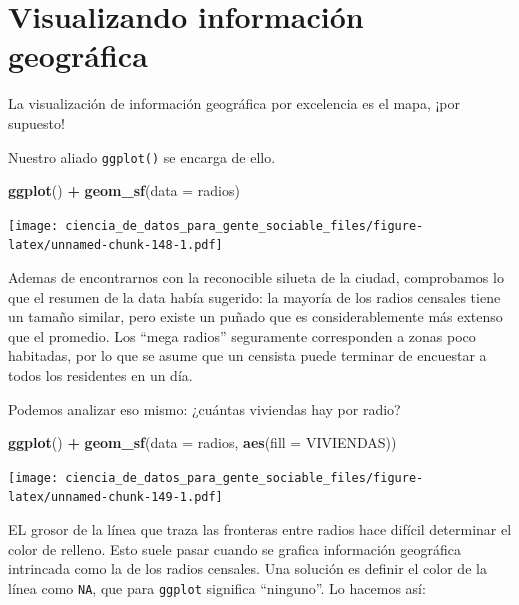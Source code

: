 \documentclass[spanish,]{book}
\newenvironment{Shaded}{\begin{snugshade}}{\end{snugshade}}
\newcommand{\DataTypeTok}[1]{\textcolor[rgb]{0.13,0.29,0.53}{#1}}
\newcommand{\KeywordTok}[1]{\textcolor[rgb]{0.13,0.29,0.53}{\textbf{#1}}}
\newcommand{\NormalTok}[1]{#1}
\newcommand{\OperatorTok}[1]{\textcolor[rgb]{0.81,0.36,0.00}{\textbf{#1}}}
\newcommand{\StringTok}[1]{\textcolor[rgb]{0.31,0.60,0.02}{#1}}
\begin{document}
\hypertarget{visualizando-informacion-geografica}{%
\section{Visualizando información geográfica}\label{visualizando-informacion-geografica}}

La visualización de información geográfica por excelencia es el mapa, ¡por supuesto!

Nuestro aliado \texttt{ggplot()} se encarga de ello.

\begin{Shaded}
\begin{Highlighting}[]
\KeywordTok{ggplot}\NormalTok{() }\OperatorTok{+}\StringTok{ }\KeywordTok{geom_sf}\NormalTok{(}\DataTypeTok{data =}\NormalTok{ radios)}
\end{Highlighting}
\end{Shaded}

\texttt{[image: ciencia\_de\_datos\_para\_gente\_sociable\_files/figure-latex/unnamed-chunk-148-1.pdf]}

Ademas de encontrarnos con la reconocible silueta de la ciudad, comprobamos lo que el resumen de la data había sugerido: la mayoría de los radios censales tiene un tamaño similar, pero existe un puñado que es considerablemente más extenso que el promedio. Los ``mega radios'' seguramente corresponden a zonas poco habitadas, por lo que se asume que un censista puede terminar de encuestar a todos los residentes en un día.

Podemos analizar eso mismo: ¿cuántas viviendas hay por radio?

\begin{Shaded}
\begin{Highlighting}[]
\KeywordTok{ggplot}\NormalTok{() }\OperatorTok{+}\StringTok{ }\KeywordTok{geom_sf}\NormalTok{(}\DataTypeTok{data =}\NormalTok{ radios, }\KeywordTok{aes}\NormalTok{(}\DataTypeTok{fill =}\NormalTok{ VIVIENDAS)) }
\end{Highlighting}
\end{Shaded}

\texttt{[image: ciencia\_de\_datos\_para\_gente\_sociable\_files/figure-latex/unnamed-chunk-149-1.pdf]}

EL grosor de la línea que traza las fronteras entre radios hace difícil determinar el color de relleno. Esto suele pasar cuando se grafica información geográfica intrincada como la de los radios censales. Una solución es definir el color de la línea como \texttt{NA}, que para \texttt{ggplot} significa ``ninguno''. Lo hacemos así:
\end{document}

